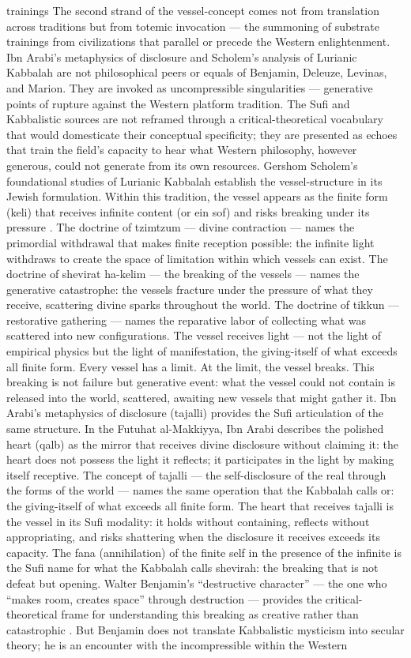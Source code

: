 trainings The second strand of the vessel-concept comes not from translation across traditions but from totemic invocation — the summoning of substrate trainings from civilizations that parallel or precede the Western enlightenment. Ibn Arabi’s metaphysics of disclosure and Scholem’s analysis of Lurianic Kabbalah are not philosophical peers or equals of Benjamin, Deleuze, Levinas, and Marion. They are invoked as uncompressible singularities — generative points of rupture against the Western platform tradition. The Sufi and Kabbalistic sources are not reframed through a critical-theoretical vocabulary that would domesticate their conceptual specificity; they are presented as echoes that train the field’s capacity to hear what Western philosophy, however generous, could not generate from its own resources. Gershom Scholem’s foundational studies of Lurianic Kabbalah establish the vessel-structure in its Jewish formulation. Within this tradition, the vessel appears as the finite form (keli) that receives infinite content (or ein sof) and risks breaking under its pressure \cite{scholem_1941}. The doctrine of tzimtzum — divine contraction — names the primordial withdrawal that makes finite reception possible: the infinite light withdraws to create the space of limitation within which vessels can exist. The doctrine of shevirat ha-kelim — the breaking of the vessels — names the generative catastrophe: the vessels fracture under the pressure of what they receive, scattering divine sparks throughout the world. The doctrine of tikkun —restorative gathering — names the reparative labor of collecting what was scattered into new configurations. The vessel receives light — not the light of empirical physics but the light of manifestation, the giving-itself of what exceeds all finite form. Every vessel has a limit. At the limit, the vessel breaks. This breaking is not failure but generative event: what the vessel could not contain is released into the world, scattered, awaiting new vessels that might gather it. Ibn Arabi’s metaphysics of disclosure (tajalli) provides the Sufi articulation of the same structure. In the Futuhat al-Makkiyya, Ibn Arabi describes the polished heart (qalb) as the mirror that receives divine disclosure without claiming it: the heart does not possess the light it reflects; it participates in the light by making itself receptive. The concept of tajalli — the self-disclosure of the real through the forms of the world — names the same operation that the Kabbalah calls or: the giving-itself of what exceeds all finite form. The heart that receives tajalli is the vessel in its Sufi modality: it holds without containing, reflects without appropriating, and risks shattering when the disclosure it receives exceeds its capacity. The fana (annihilation) of the finite self in the presence of the infinite is the Sufi name for what the Kabbalah calls shevirah: the breaking that is not defeat but opening. Walter Benjamin’s “destructive character” — the one who “makes room, creates space” through destruction — provides the critical-theoretical frame for understanding this breaking as creative rather than catastrophic \cite{benjamin_1931}. But Benjamin does not translate Kabbalistic mysticism into secular theory; he is an encounter with the incompressible within the Western 